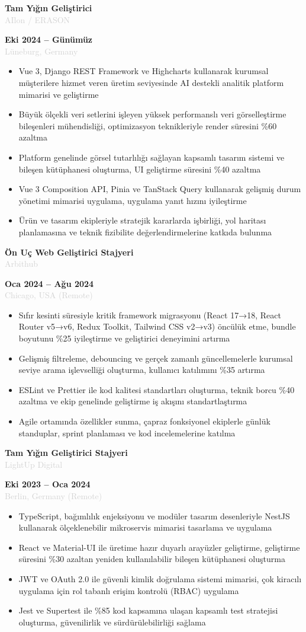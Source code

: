 \documentclass[10pt,a4paper]{article}
\newcommand{\Experience}[4]{%
  \vspace{2pt}
  \noindent
  \begin{minipage}[t]{0.70\textwidth}
    {\normalsize\textbf{\color{darkgray}#3}} \\
    \textcolor{lightgray}{\small #1}
  \end{minipage}%
  \hfill
  \begin{minipage}[t]{0.28\textwidth}
    \raggedleft
    \textcolor{mediumgray}{\small\textbf{#4}} \\
    \textcolor{lightgray}{\small #2}
  \end{minipage}
  \vspace{1pt}
}
\begin{document}
\Experience{AIlon / ERASON}{Lüneburg, Germany}{Tam Yığın Geliştirici}{Eki 2024 -- Günümüz}
\begin{itemize}
  \item Vue 3, Django REST Framework ve Highcharts kullanarak kurumsal müşterilere hizmet veren üretim seviyesinde AI destekli analitik platform mimarisi ve geliştirme
  \item Büyük ölçekli veri setlerini işleyen yüksek performanslı veri görselleştirme bileşenleri mühendisliği, optimizasyon teknikleriyle render süresini \%60 azaltma
  \item Platform genelinde görsel tutarlılığı sağlayan kapsamlı tasarım sistemi ve bileşen kütüphanesi oluşturma, UI geliştirme süresini \%40 azaltma
  \item Vue 3 Composition API, Pinia ve TanStack Query kullanarak gelişmiş durum yönetimi mimarisi uygulama, uygulama yanıt hızını iyileştirme
  \item Ürün ve tasarım ekipleriyle stratejik kararlarda işbirliği, yol haritası planlamasına ve teknik fizibilite değerlendirmelerine katkıda bulunma
\end{itemize}

\Experience{Arbithub}{Chicago, USA (Remote)}{Ön Uç Web Geliştirici Stajyeri}{Oca 2024 -- Ağu 2024}
\begin{itemize}
  \item Sıfır kesinti süresiyle kritik framework migrasyonu (React 17→18, React Router v5→v6, Redux Toolkit, Tailwind CSS v2→v3) öncülük etme, bundle boyutunu \%25 iyileştirme ve geliştirici deneyimini artırma
  \item Gelişmiş filtreleme, debouncing ve gerçek zamanlı güncellemelerle kurumsal seviye arama işlevselliği oluşturma, kullanıcı katılımını \%35 artırma
  \item ESLint ve Prettier ile kod kalitesi standartları oluşturma, teknik borcu \%40 azaltma ve ekip genelinde geliştirme iş akışını standartlaştırma
  \item Agile ortamında özellikler sunma, çapraz fonksiyonel ekiplerle günlük standuplar, sprint planlaması ve kod incelemelerine katılma
\end{itemize}

\Experience{LightUp Digital}{Berlin, Germany (Remote)}{Tam Yığın Geliştirici Stajyeri}{Eki 2023 -- Oca 2024}
\begin{itemize}
  \item TypeScript, bağımlılık enjeksiyonu ve modüler tasarım desenleriyle NestJS kullanarak ölçeklenebilir mikroservis mimarisi tasarlama ve uygulama
  \item React ve Material-UI ile üretime hazır duyarlı arayüzler geliştirme, geliştirme süresini \%30 azaltan yeniden kullanılabilir bileşen kütüphanesi oluşturma
  \item JWT ve OAuth 2.0 ile güvenli kimlik doğrulama sistemi mimarisi, çok kiracılı uygulama için rol tabanlı erişim kontrolü (RBAC) uygulama
  \item Jest ve Supertest ile \%85 kod kapsamına ulaşan kapsamlı test stratejisi oluşturma, güvenilirlik ve sürdürülebilirliği sağlama
\end{itemize}
\end{document}
